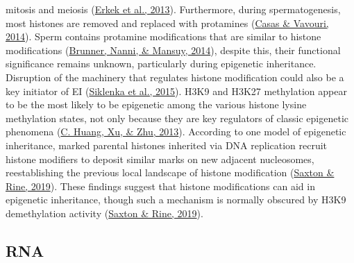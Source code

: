 \documentclass[12pt,twoside]{reedthesis}
\begin{document}
mitosis and meiosis (\protect\hyperlink{ref-erkek2013}{Erkek et al., 2013}). Furthermore, during spermatogenesis,
most histones are removed and replaced with protamines (\protect\hyperlink{ref-casas2014}{Casas \& Vavouri, 2014}).
Sperm contains protamine modifications that are similar to histone
modifications (\protect\hyperlink{ref-brunner2014}{Brunner, Nanni, \& Mansuy, 2014}), despite this, their functional
significance remains unknown, particularly during epigenetic
inheritance. Disruption of the machinery that regulates histone
modification could also be a key initiator of EI (\protect\hyperlink{ref-siklenka2015}{Siklenka et al., 2015}). H3K9
and H3K27 methylation appear to be the most likely to be epigenetic
among the various histone lysine methylation states, not only because
they are key regulators of classic epigenetic phenomena (\protect\hyperlink{ref-huang2013}{C. Huang, Xu, \& Zhu, 2013}).
According to one model of epigenetic inheritance, marked parental
histones inherited via DNA replication recruit histone modifiers to
deposit similar marks on new adjacent nucleosomes, reestablishing the
previous local landscape of histone modification (\protect\hyperlink{ref-saxton2019}{Saxton \& Rine, 2019}). These
findings suggest that histone modifications can aid in epigenetic
inheritance, though such a mechanism is normally obscured by H3K9
demethylation activity (\protect\hyperlink{ref-saxton2019}{Saxton \& Rine, 2019}).

\hypertarget{rna}{%
\subsection*{RNA}\label{rna}}
\end{document}
